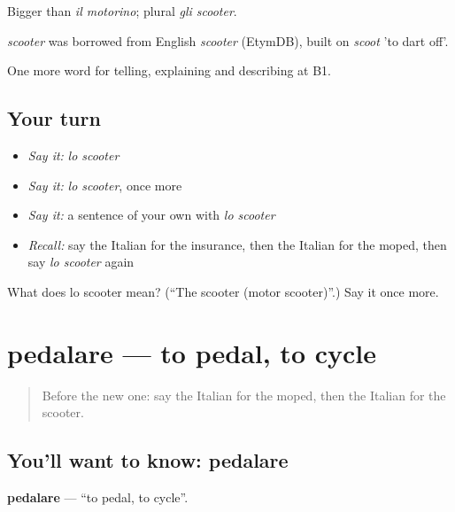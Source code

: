 Bigger than \emph{il motorino}; plural \emph{gli scooter}.

\begin{cousinweb}
\emph{scooter} was borrowed from English \emph{scooter} (EtymDB), built on \emph{scoot} 'to dart off'.
\end{cousinweb}

\begin{grammarlens}[title={What you've built}]
One more word for telling, explaining and describing at B1.
\end{grammarlens}

\subsection*{Your turn}
\begin{itemize}
\raggedright
  \item \emph{Say it:} \emph{lo scooter}
  \item \emph{Say it:} \emph{lo scooter}, once more
  \item \emph{Say it:} a sentence of your own with \emph{lo scooter}
  \item \emph{Recall:} say the Italian for the insurance, then the Italian for the moped, then say \emph{lo scooter} again
\end{itemize}

\begin{tcolorbox}[breakable,colback=teal!4,colframe=teal!35!black,title={Before you move on}]
What does lo scooter mean? (\textquotedblleft{}The scooter (motor scooter)\textquotedblright{}.) Say it once more.
\end{tcolorbox}
\section[pedalare]{pedalare — to pedal, to cycle}

\label{lesson:IT-C416-pedalare}



\begin{quote}
Before the new one: say the Italian for the moped, then the Italian for the scooter.
\end{quote}

\subsection*{You'll want to know: pedalare}
\textbf{pedalare} — \textquotedblleft{}to pedal, to cycle\textquotedblright{}.

